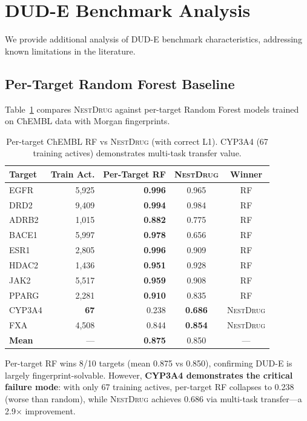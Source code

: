 \documentclass[runningheads]{llncs}
\newcommand{\methodname}{\textsc{NestDrug}}
\begin{document}
\section{DUD-E Benchmark Analysis}
\label{app:dude_analysis}

We provide additional analysis of DUD-E benchmark characteristics, addressing known limitations in the literature.

\subsection{Per-Target Random Forest Baseline}

Table~\ref{tab:per_target_rf} compares \methodname{} against per-target Random Forest models trained on ChEMBL data with Morgan fingerprints.

\begin{table}[t]
\caption{Per-target ChEMBL RF vs \methodname{} (with correct L1). CYP3A4 (67 training actives) demonstrates multi-task transfer value.}
\label{tab:per_target_rf}
\centering
\small
\begin{tabular}{@{}lrrcc@{}}
\toprule
Target & Train Act. & Per-Target RF & \methodname{} & Winner \\
\midrule
EGFR & 5,925 & \textbf{0.996} & 0.965 & RF \\
DRD2 & 9,409 & \textbf{0.994} & 0.984 & RF \\
ADRB2 & 1,015 & \textbf{0.882} & 0.775 & RF \\
BACE1 & 5,997 & \textbf{0.978} & 0.656 & RF \\
ESR1 & 2,805 & \textbf{0.996} & 0.909 & RF \\
HDAC2 & 1,436 & \textbf{0.951} & 0.928 & RF \\
JAK2 & 5,517 & \textbf{0.959} & 0.908 & RF \\
PPARG & 2,281 & \textbf{0.910} & 0.835 & RF \\
CYP3A4 & \textbf{67} & 0.238 & \textbf{0.686} & \methodname{} \\
FXA & 4,508 & 0.844 & \textbf{0.854} & \methodname{} \\
\midrule
\textbf{Mean} & --- & \textbf{0.875} & 0.850 & --- \\
\bottomrule
\end{tabular}
\end{table}

Per-target RF wins 8/10 targets (mean 0.875 vs 0.850), confirming DUD-E is largely fingerprint-solvable. However, \textbf{CYP3A4 demonstrates the critical failure mode}: with only 67 training actives, per-target RF collapses to 0.238 (worse than random), while \methodname{} achieves 0.686 via multi-task transfer---a 2.9$\times$ improvement.
\end{document}
